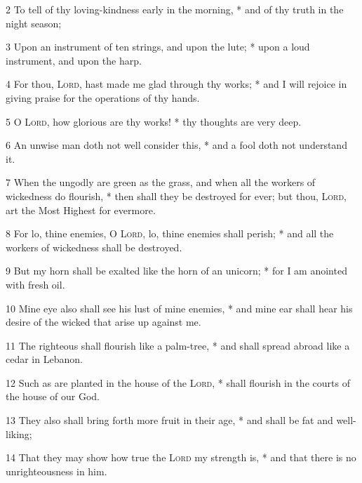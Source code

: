 2 To tell of thy loving-kindness early in the morning, * and of thy truth in the night season;\par
3 Upon an instrument of ten strings, and upon the lute; * upon a loud instrument, and upon the harp.\par
4 For thou, {\textsc{Lord}}, hast made me glad through thy works; * and I will rejoice in giving praise for the operations of thy hands.\par
5 O {\textsc{Lord}}, how glorious are thy works! * thy thoughts are very deep.\par
6 An unwise man doth not well consider this, * and a fool doth not understand it.\par
7 When the ungodly are green as the grass, and when all the workers of wickedness do flourish, * then shall they be destroyed for ever; but thou, {\textsc{Lord}}, art the Most Highest for evermore.\par
8 For lo, thine enemies, O {\textsc{Lord}}, lo, thine enemies shall perish; * and all the workers of wickedness shall be destroyed.\par
9 But my horn shall be exalted like the horn of an unicorn; * for I am anointed with fresh oil.\par
10 Mine eye also shall see his lust of mine enemies, * and mine ear shall hear his desire of the wicked that arise up against me.\par
11 The righteous shall flourish like a palm-tree, * and shall spread abroad like a cedar in Lebanon.\par
12 Such as are planted in the house of the {\textsc{Lord}}, * shall flourish in the courts of the house of our God.\par
13 They also shall bring forth more fruit in their age, * and shall be fat and well-liking;\par
14 That they may show how true the {\textsc{Lord}} my strength is, * and that there is no unrighteousness in him.
